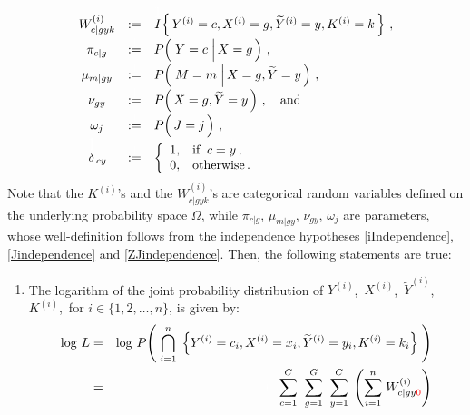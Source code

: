 \begin{theorem}
\begin{equation*}
\begin{array}{ccll}
	W^{(i)}_{c \vert gyk}
		&:=&
		\overset{\textnormal{\large\color{white}1}}{I}\!\left\{\,Y^{(i)}=c,X^{(i)}=g,\widetilde{Y}^{(i)}=y,K^{(i)}=k\,\right\}\,,
	\\
	\pi_{c \vert g}
		&\overset{{\color{white}\vert}}{:=}&
		P\!\left(\,\left.\overset{{\color{white}.}}{Y}=c\;\right\vert X=g\,\right)\,,
	\\
	\mu_{m \vert gy}
		&\overset{{\color{white}\vert}}{:=}&
		P\!\left(\,\left.\overset{{\color{white}.}}{M}=m\;\right\vert X=g, \widetilde{Y}=y\,\right)\,,
	\\
	\nu_{gy}
		&\overset{{\color{white}\vert}}{:=}&
		P\!\left(\,\overset{{\color{white}.}}{X}=g, \widetilde{Y}=y\,\right)\,,
		\quad\textnormal{and}
	\\
	\omega_{j}
		&\overset{{\color{white}\vert}}{:=}&
		P\!\left(\,\overset{{\color{white}.}}{J}=j\,\right)\,,
	\\
	\overset{\textnormal{\Large\color{white}1}}{\delta}_{cy}
		&\overset{{\color{white}\vert}}{:=}&
		\left\{\begin{array}{cl}
			1, & \textnormal{if}\;\; c = y\,,
			\\
			0, & \textnormal{otherwise}\,.
		\end{array}\right.
\end{array}
\end{equation*}
Note that the $K^{(i)}$'s and the $W^{(i)}_{c \vert gyk}$'s
are categorical random variables defined on the underlying probability space $\Omega$,
while $\pi_{c \vert g}$, $\mu_{m \vert gy}$, $\nu_{gy}$, $\omega_{j}$ are parameters,
whose well-definition follows from the independence hypotheses
\eqref{iIndependence}, \eqref{Jindependence} and \eqref{ZJindependence}.
\vskip 0.3cm
\noindent
Then, the following statements are true:
\begin{enumerate}
\item
	The logarithm of the joint probability distribution of
	\;$Y^{(i)}$,\,
	$X^{(i)}$,\,
	$\widetilde{Y}^{(i)}$,\,
	$K^{(i)}$,\,
	for \;$i \in \{1,2,\ldots,n\}$,\;
	is given by:
	\begin{eqnarray*}
	\log\,L
		&=&
		\log\,P\!\left(\;
			\overset{n}{\underset{i=1}{\bigcap}}\;
			\left\{
				Y^{(i)}=c_{i},X^{(i)}=x_{i},\widetilde{Y}^{(i)}=y_{i},K^{(i)}=k_{i}
			\right\}
		\;\right)
	\\
	&=&
		{\color{white}+} \;\;
		\overset{C}{\underset{c=1}{\sum}}\;\;
		\overset{G}{\underset{g=1}{\sum}}\;\;
		\overset{C}{\underset{y=1}{\sum}}\;
		\left(\overset{n}{\underset{i=1}{\sum}}\;W^{(i)}_{c \vert gy{\color{red}0}}\right)

\end{eqnarray*}
\end{enumerate}
\end{theorem}
